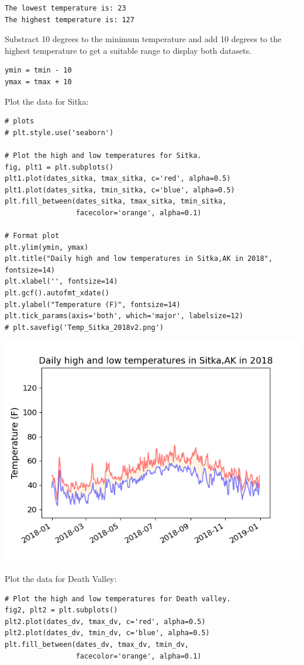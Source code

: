 \documentclass[10pt]{book}
\begin{document}
\begin{enumerate}
\label{org6bc8a1c}
\begin{verbatim}
The lowest temperature is: 23
The highest temperature is: 127
\end{verbatim}

Substract 10 degrees to the minimum temperature and add 10 degrees to the highest temperature to get a suitable range to display both datasets.
\begin{verbatim}
ymin = tmin - 10
ymax = tmax + 10
\end{verbatim}

Plot the data for Sitka:
\begin{verbatim}
# plots
# plt.style.use('seaborn')

# Plot the high and low temperatures for Sitka.
fig, plt1 = plt.subplots()
plt1.plot(dates_sitka, tmax_sitka, c='red', alpha=0.5)
plt1.plot(dates_sitka, tmin_sitka, c='blue', alpha=0.5)
plt.fill_between(dates_sitka, tmax_sitka, tmin_sitka,
                 facecolor='orange', alpha=0.1)

# Format plot
plt.ylim(ymin, ymax)
plt.title("Daily high and low temperatures in Sitka,AK in 2018", fontsize=14)
plt.xlabel('', fontsize=14)
plt.gcf().autofmt_xdate()
plt.ylabel("Temperature (F)", fontsize=14)
plt.tick_params(axis='both', which='major', labelsize=12)
# plt.savefig('Temp_Sitka_2018v2.png')
\end{verbatim}

\begin{center}
\includegraphics[width=.9\linewidth]{output/images/Temp_range_Sitka.png}
\label{orgf8d646e}
\end{center}

Plot the data for Death Valley:
\begin{verbatim}
# Plot the high and low temperatures for Death valley.
fig2, plt2 = plt.subplots()
plt2.plot(dates_dv, tmax_dv, c='red', alpha=0.5)
plt2.plot(dates_dv, tmin_dv, c='blue', alpha=0.5)
plt.fill_between(dates_dv, tmax_dv, tmin_dv,
                 facecolor='orange', alpha=0.1)


\end{verbatim}
\end{enumerate}
\end{document}

